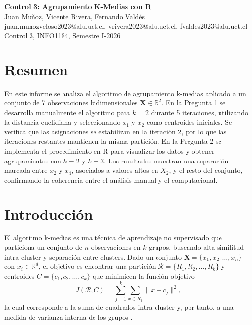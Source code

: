 \documentclass[10pt,a4paper]{article}
\begin{document}
\begin{center}
  {\LARGE \textbf{Control 3: Agrupamiento K-Medias con R}} \\[4pt]
  {\normalsize Juan Mu\~noz, Vicente Rivera, Fernando Vald\'es} \\[2pt]
  {\small juan.munozveloso2023@alu.uct.cl, vrivera2023@alu.uct.cl, fvaldes2023@alu.uct.cl} \\[2pt]
  {\small Control 3, INFO1184, Semestre I-2026}
\end{center}

\section*{Resumen}

En este informe se analiza el algoritmo de agrupamiento k-medias aplicado a un conjunto de 7 observaciones bidimensionales $\mathbf{X} \in \mathbb{R}^2$. En la Pregunta 1 se desarrolla manualmente el algoritmo para $k=2$ durante 5 iteraciones, utilizando la distancia euclidiana y seleccionando $x_1$ y $x_2$ como centroides iniciales. Se verifica que las asignaciones se estabilizan en la iteraci\'on 2, por lo que las iteraciones restantes mantienen la misma partici\'on. En la Pregunta 2 se implementa el procedimiento en R para visualizar los datos y obtener agrupamientos con $k=2$ y $k=3$. Los resultados muestran una separaci\'on marcada entre $x_2$ y $x_4$, asociados a valores altos en $X_2$, y el resto del conjunto, confirmando la coherencia entre el an\'alisis manual y el computacional.

\section{Introducci\'on}

El algoritmo k-medias es una t\'ecnica de aprendizaje no supervisado que particiona un conjunto de $n$ observaciones en $k$ grupos, buscando alta similitud intra-cluster y separaci\'on entre clusters. Dado un conjunto $\mathbf{X} = \{x_1, x_2, \ldots, x_n\}$ con $x_i \in \mathbb{R}^d$, el objetivo es encontrar una partici\'on $\mathcal{R} = \{R_1, R_2, \ldots, R_k\}$ y centroides $C = \{c_1, c_2, \ldots, c_k\}$ que minimicen la funci\'on objetivo
\begin{equation}
J(\mathcal{R}, C) = \sum_{j=1}^{k} \sum_{x \in R_j} \|x - c_j\|^2,
\label{eq:objetivo}
\end{equation}
la cual corresponde a la suma de cuadrados intra-cluster y, por tanto, a una medida de varianza interna de los grupos \parencite{duda2001}.
\end{document}
